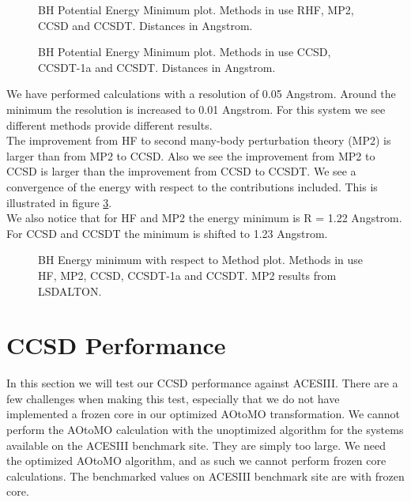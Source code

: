 \begin{figure}[h!]
\begin{center}
\caption{BH Potential Energy Minimum plot. Methods in use RHF, MP2, CCSD and CCSDT. Distances in Angstrom.}
\label{fig:zom1}
\end{center}
\end{figure}

\begin{figure}[h!]
\begin{center}
\caption{BH Potential Energy Minimum plot. Methods in use CCSD, CCSDT-1a and CCSDT. Distances in Angstrom.}
\label{fig:zom2}
\end{center}
\end{figure}






We have performed calculations with a resolution of 0.05
Angstrom. Around the minimum the resolution is increased to 0.01
Angstrom.  For this system we see different methods provide different
results. \\

The improvement from HF to second many-body perturbation theory (MP2) is larger than from MP2 to CCSD. Also
we see the improvement from MP2 to CCSD is larger than the improvement
from CCSD to CCSDT. We see a convergence of the energy with 
respect to the contributions included. This is illustrated in figure
\ref{fig:zom3}. \\

We also notice that for HF and MP2 the energy minimum is R = 1.22
Angstrom. For CCSD and CCSDT the minimum is shifted to 1.23 Angstrom.

\newpage

\begin{figure}[h!]
\begin{center}
\caption{BH Energy minimum with respect to Method plot. Methods in use HF, MP2, CCSD, CCSDT-1a and CCSDT. MP2 results from LSDALTON. }
\label{fig:zom3}
\end{center}
\end{figure}

\section{CCSD Performance}
In this section we will test our CCSD performance against
ACESIII. There are a few challenges when making this test, especially
that we do not have implemented a frozen core in our optimized AOtoMO
transformation. We cannot perform the AOtoMO calculation with the
unoptimized algorithm for the systems available on the ACESIII
benchmark site. They are simply too large. We need the optimized AOtoMO
algorithm, and as such we cannot perform frozen core calculations. The
benchmarked values on ACESIII benchmark site are with frozen core. \\

